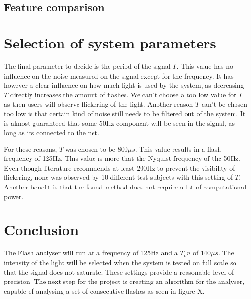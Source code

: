 \subsection{Feature comparison}


\section{Selection of system parameters}

The final parameter to decide is the period of the signal $T$. This value has no influence on the noise measured on the signal except for the frequency. It has however a clear influence on how much light is used by the system, as decreasing $T$ directly increases the amount of flashes. We can't choose a too low value for $T$ as then users will observe flickering of the light. Another reason $T$ can't be chosen too low is that certain kind of noise still needs to be filtered out of the system. It is almost guaranteed that some 50Hz component will be seen in the signal, as long as its connected to the net. 

For these reasons, $T$ was chosen to be 800$\mu s$. This value results in a flash frequency of 125Hz. This value is more that the Nyquist frequency of the 50Hz. Even though literature recommends at least 200Hz to prevent the visibility of flickering, none was observed by 10 different test subjects with this setting of $T$. Another benefit is that the found method does not require a lot of computational power.

\section{Conclusion}
The Flash analyser will run at a frequency of 125Hz and a $T_on$ of $140\mu s$. The intensity of the light will be selected when the system is tested on full scale so that the signal does not saturate. These settings provide a reasonable level of precision. The next step for the project is creating an algorithm for the analyser, capable of analysing a set of consecutive flashes as seen in figure X.